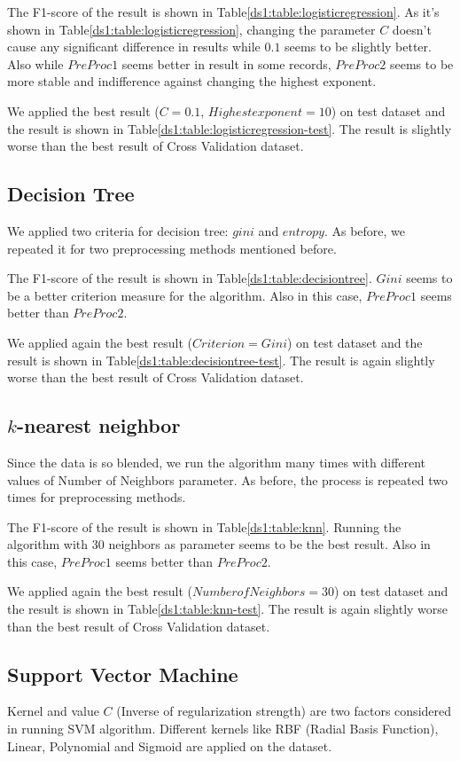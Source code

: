 The F1-score of the result is shown in Table\ref{ds1:table:logisticregression}. As it's shown in Table\ref{ds1:table:logisticregression}, changing the parameter $C$ doesn't cause any significant difference in results while $0.1$ seems to be slightly better. Also while $PreProc1$ seems better in result in some records, $PreProc2$ seems to be more stable and indifference against changing the highest exponent.


We applied the best result ($C=0.1$, $Highest exponent=10$) on test dataset and the result is shown in Table\ref{ds1:table:logisticregression-test}. The result is slightly worse than the best result of Cross Validation dataset.


\subsection{Decision Tree}
We applied two criteria for decision tree: $gini$ and $entropy$. As before, we repeated it for two preprocessing methods mentioned before.

The F1-score of the result is shown in Table\ref{ds1:table:decisiontree}. $Gini$ seems to be a better criterion measure for the algorithm. Also in this case, $PreProc1$ seems better than $PreProc2$.

We applied again the best result ($Criterion=Gini$) on test dataset and the result is shown in Table\ref{ds1:table:decisiontree-test}. The result is again slightly worse than the best result of Cross Validation dataset.

\subsection{$k$-nearest neighbor}
Since the data is so blended, we run the algorithm many times with different values of Number of Neighbors parameter. As before, the process is repeated two times for preprocessing methods.

The F1-score of the result is shown in Table\ref{ds1:table:knn}. Running the algorithm with $30$ neighbors as parameter seems to be the best result. Also in this case, $PreProc1$ seems better than $PreProc2$.

We applied again the best result ($Number of Neighbors=30$) on test dataset and the result is shown in Table\ref{ds1:table:knn-test}. The result is again slightly worse than the best result of Cross Validation dataset.

\subsection{Support Vector Machine}
Kernel and value $C$ (Inverse of regularization strength) are two factors considered in running SVM algorithm. Different kernels like RBF (Radial Basis Function), Linear, Polynomial and Sigmoid are applied on the dataset.

